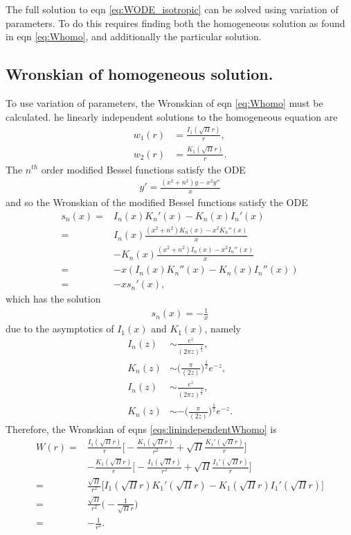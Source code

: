\documentclass[../main.tex]{subfiles}
\begin{document}
     
The full solution to eqn \ref{eq:WODE_isotropic} can be solved using variation
of parameters. To do this requires finding both the homogeneous solution
as found in eqn \ref{eq:Whomo}, and additionally the particular solution.

\subsection{Wronskian of homogeneous solution.}
To use variation of parameters, the Wronskian of eqn \ref{eq:Whomo} must be
calculated. he linearly independent solutions to the homogeneous equation are
\begin{subequations}
  \label{eqs:linindependentWhomo}
  \begin{align}
    w_1(r)&=\frac{I_1(\sqrt{\Pi}r)}{r},\\
    w_2(r)&=\frac{K_1(\sqrt{\Pi}r)}{r}.
  \end{align}
\end{subequations}
The $n^{th}$ order modified Bessel functions satisfy the ODE
\begin{align}
  y'=\frac{(x^2+n^2)y-x^2y''}{x}
\end{align}
and so the Wronskian of the modified Bessel functions satisfy the ODE
\begin{align}
  s_n(x)=
  & I_n(x)K_n'(x)-K_n(x)I_n'(x)\nonumber\\
  =& I_n(x)\frac{(x^2+n^2)K_n(x)-x^2K_n''(x)}{x}\nonumber\\
  & -K_n(x)\frac{(x^2+n^2)I_n(x)-x^2I_n''(x)}{x}\nonumber\\
  =& -x(I_n(x)K_n''(x)-K_n(x)I_n''(x))\nonumber\\
  =& - x s_n'(x),
\end{align}
which has the solution
\begin{align}
  s_n(x)=-\frac{1}{x}
\end{align}
due to the asymptotics of $I_1(x)$ and $K_1(x)$, namely
\begin{align}
  I_n(z)&\sim\frac{e^z}{(2\pi z)^{\frac{1}{2}}},\\
  K_n(z)&\sim\bigg(\frac{\pi}{(2 z)}\bigg)^{\frac{1}{2}}e^{-z},\\
  I_n(z)&\sim\frac{e^z}{(2\pi z)^{\frac{1}{2}}},\\
  K_n(z)&\sim-\bigg(\frac{\pi}{(2 z)}\bigg)^{\frac{1}{2}}e^{-z}.
\end{align}
Therefore, the Wronskian of eqns \ref{eqs:linindependentWhomo} is
\begin{align}\label{eq:wronskian}
  W(r)=
  & \frac{I_1(\sqrt{\Pi}r)}{r}\bigg[-\frac{K_1(\sqrt{\Pi}r)}{r^2}
    +\sqrt{\Pi}\frac{K_1'(\sqrt{\Pi}r)}{r}\bigg]\nonumber\\
  &-\frac{K_1(\sqrt{\Pi}r)}{r}\bigg[-\frac{I_1(\sqrt{\Pi}r)}{r^2}
    +\sqrt{\Pi}\frac{I_1'(\sqrt{\Pi}r)}{r}\bigg]\nonumber\\
  =& \frac{\sqrt{\Pi}}{r^2}\bigg[I_1(\sqrt{\Pi}r)K_1'(\sqrt{\Pi}r)
     - K_1(\sqrt{\Pi}r)I_1'(\sqrt{\Pi}r)\bigg]\nonumber\\
  =& \frac{\sqrt{\Pi}}{r^2}\bigg(-\frac{1}{\sqrt{\Pi}r}\bigg)\nonumber\\
  =& -\frac{1}{r^3}.
\end{align}
\end{document}
